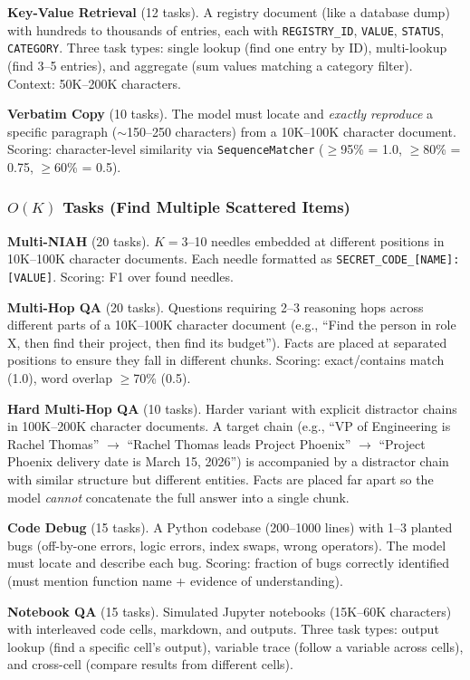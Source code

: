 \documentclass{article}
\begin{document}
\textbf{Key-Value Retrieval} (12 tasks). A registry document (like a database dump) with hundreds to thousands of entries, each with \texttt{REGISTRY\_ID}, \texttt{VALUE}, \texttt{STATUS}, \texttt{CATEGORY}. Three task types: single lookup (find one entry by ID), multi-lookup (find 3--5 entries), and aggregate (sum values matching a category filter). Context: 50K--200K characters.

\textbf{Verbatim Copy} (10 tasks). The model must locate and \emph{exactly reproduce} a specific paragraph ($\sim$150--250 characters) from a 10K--100K character document. Scoring: character-level similarity via \texttt{SequenceMatcher} ($\geq$95\% = 1.0, $\geq$80\% = 0.75, $\geq$60\% = 0.5).

\subsubsection{$O(K)$ Tasks (Find Multiple Scattered Items)}

\textbf{Multi-NIAH} (20 tasks). $K{=}3$--10 needles embedded at different positions in 10K--100K character documents. Each needle formatted as \texttt{SECRET\_CODE\_[NAME]: [VALUE]}. Scoring: F1 over found needles.

\textbf{Multi-Hop QA} (20 tasks). Questions requiring 2--3 reasoning hops across different parts of a 10K--100K character document (e.g., ``Find the person in role X, then find their project, then find its budget''). Facts are placed at separated positions to ensure they fall in different chunks. Scoring: exact/contains match (1.0), word overlap $\geq$70\% (0.5).

\textbf{Hard Multi-Hop QA} (10 tasks). Harder variant with explicit distractor chains in 100K--200K character documents. A target chain (e.g., ``VP of Engineering is Rachel Thomas'' $\to$ ``Rachel Thomas leads Project Phoenix'' $\to$ ``Project Phoenix delivery date is March 15, 2026'') is accompanied by a distractor chain with similar structure but different entities. Facts are placed far apart so the model \emph{cannot} concatenate the full answer into a single chunk.

\textbf{Code Debug} (15 tasks). A Python codebase (200--1000 lines) with 1--3 planted bugs (off-by-one errors, logic errors, index swaps, wrong operators). The model must locate and describe each bug. Scoring: fraction of bugs correctly identified (must mention function name + evidence of understanding).

\textbf{Notebook QA} (15 tasks). Simulated Jupyter notebooks (15K--60K characters) with interleaved code cells, markdown, and outputs. Three task types: output lookup (find a specific cell's output), variable trace (follow a variable across cells), and cross-cell (compare results from different cells).
\end{document}
